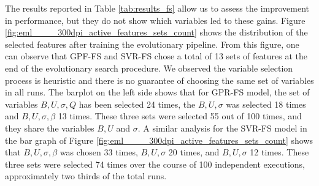 \documentclass[a4paper,12pt, english]{article}
\begin{document}
The results reported in Table \ref{tab:results_fs} allow us to assess the improvement in performance, but they do not show which variables led to these gains. Figure \ref{fig:eml____300dpi_active_features_sets_count} shows the distribution of the selected features after training the evolutionary pipeline.
From this figure, one can observe that GPF-FS and SVR-FS chose a total of 13 sets of features at the end of the evolutionary search procedure. We observed the variable selection process is heuristic and there is no guarantee of choosing the same set of variables in all runs.
% 
The barplot on the left side shows that for  GPR-FS model, the set of variables $ B, U, \sigma, Q $ has been selected 24 times, the  $ B, U, \sigma $ was selected 18 times and  $ B, U, \sigma, \beta $ 13 times. These three sets were selected 55 out of 100 times, and they share the variables $ B, U $ and $ \sigma $.
A similar analysis for the SVR-FS model in the bar graph of Figure \ref{fig:eml____300dpi_active_features_sets_count} shows that $ B, U, \sigma, \beta $ was chosen 33 times,  $ B, U, \sigma $ 20 times, and $ B, U, \sigma $ 12 times. These three sets were selected 74 times over the course of 100 independent executions, approximately two thirds of the total runs.
% 
\end{document}
